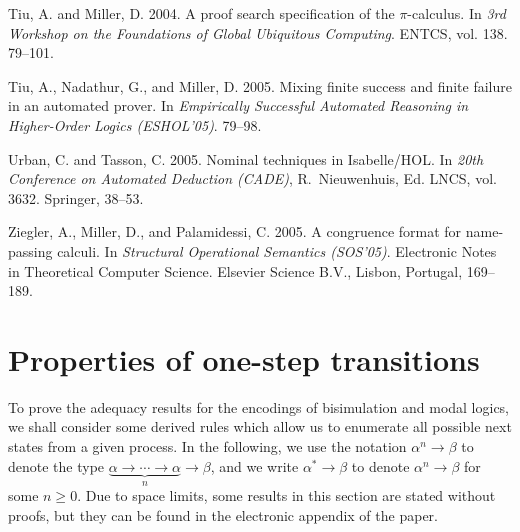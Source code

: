 \documentclass{acmtrans2m}
\newcommand{\ra}{\rightarrow}
\begin{document}
\begin{thebibliography}{}
{\sc Tiu, A.} {\sc and} {\sc Miller, D.} 2004.
\newblock A proof search specification of the $\pi$-calculus.
\newblock In {\em 3rd Workshop on the Foundations of Global Ubiquitous
  Computing}. ENTCS, vol. 138. 79--101.

{\sc Tiu, A.}, {\sc Nadathur, G.}, {\sc and} {\sc Miller, D.} 2005.
\newblock Mixing finite success and finite failure in an automated prover.
\newblock In {\em Empirically Successful Automated Reasoning in Higher-Order
  Logics (ESHOL'05)}. 79--98.

{\sc Urban, C.} {\sc and} {\sc Tasson, C.} 2005.
\newblock Nominal techniques in {I}sabelle/{HOL}.
\newblock In {\em 20th Conference on Automated Deduction (CADE)},
  {R.~Nieuwenhuis}, Ed. LNCS, vol. 3632. Springer, 38--53.

{\sc Ziegler, A.}, {\sc Miller, D.}, {\sc and} {\sc Palamidessi, C.} 2005.
\newblock A congruence format for name-passing calculi.
\newblock In {\em Structural Operational Semantics (SOS'05)}. Electronic Notes
  in Theoretical Computer Science. Elsevier Science B.V., Lisbon, Portugal,
  169--189.

\end{thebibliography}

\newpage
\appendix
 
\def\onef{\hbox{\sl one}_f}
\def\oneb{\hbox{\sl one}_b}
\def\pidef{{\bf D}_\pi}
\def\defrule{\mbox{\it def}}


\section{Properties of one-step transitions}

To prove the adequacy results for the encodings of bisimulation and 
modal logics, we shall consider 
some derived rules which allow us to enumerate all possible next states
from a given process. 
In the following, we use the notation $\alpha^n \ra \beta$ to denote the type
$\underbrace{\alpha \ra \cdots \ra \alpha}_{n} \ra \beta$, and we write $\alpha^* \ra \beta$
to denote $\alpha^n \ra \beta$ for some $n \geq 0.$ Due to space limits, some results
in this section are stated without proofs, but they can be found
in the electronic appendix of the paper.
\end{document}
